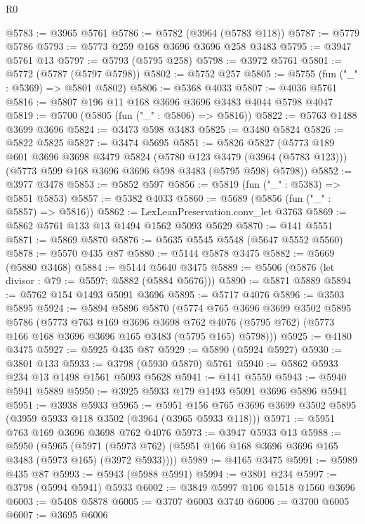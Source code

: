 \begin{lexlean}{R0}
\begin{coremodule}
@5783 := @3965 @5761
@5786 := @5782 (@3964 (@5783 @118))
@5787 := @5779 @5786
@5793 := @5773 @259 @168 @3696 @3696 @258 @3483
@5795 := @3947 @5761 @13
@5797 := @5793 (@5795 @258)
@5798 := @3972 @5761
@5801 := @5772 (@5787 (@5797 @5798))
@5802 := @5752 @257
@5805 := @5755 (fun ("_" : @5369) => @5801 @5802)
@5806 := @5368 @4033
@5807 := @4036 @5761
@5816 := @5807 @196 @11 @168 @3696 @3696 @3483 @4044 @5798 @4047
@5819 := @5700 (@5805 (fun ("_" : @5806) => @5816))
@5822 := @5763 @1488 @3699 @3696
@5824 := @3473 @598 @3483
@5825 := @3480 @5824
@5826 := @5822 @5825
@5827 := @3474 @5695
@5851 := @5826
    @5827
    (@5773
      @189
      @601
      @3696
      @3698
      @3479
      @5824
      (@5780 @123 @3479 (@3964 (@5783 @123)))
      (@5773 @599 @168 @3696 @3696 @598 @3483 (@5795 @598) @5798))
@5852 := @3977 @3478
@5853 := @5852 @597
@5856 := @5819 (fun ("_" : @5383) => @5851 @5853)
@5857 := @5382 @4033
@5860 := @5689 (@5856 (fun ("_" : @5857) => @5816))
@5862 := LexLeanPreservation.conv_let @3763
@5869 := @5862 @5761 @133 @13 @1494 @1562 @5093 @5629
@5870 := @141 @5551
@5871 := @5869 @5870
@5876 := @5635 @5545 @5548 (@5647 @5552 @5560)
@5878 := @5570 @435 @87
@5880 := @5144 @5878 @3475
@5882 := @5669 (@5880 @3468)
@5884 := @5144 @5640 @3475
@5889 := @5506 (@5876 (let divisor : @79 := @5597; @5882 (@5884 @5676)))
@5890 := @5871 @5889
@5894 := @5762 @154 @1493 @5091 @3696
@5895 := @5717 @4076
@5896 := @3503 @5895
@5924 := @5894
    @5896
    @5870
    (@5774
      @765
      @3696
      @3699
      @3502
      @5895
      @5786
      (@5773
        @763
        @169
        @3696
        @3698
        @762
        @4076
        (@5795 @762)
        (@5773 @166 @168 @3696 @3696 @165 @3483 (@5795 @165) @5798)))
@5925 := @4180 @3475
@5927 := @5925 @435 @87
@5929 := @5890 (@5924 @5927)
@5930 := @3801 @133
@5933 := @3798 (@5930 @5870) @5761
@5940 := @5862 @5933 @234 @13 @1498 @1561 @5093 @5628
@5941 := @141 @5559
@5943 := @5940 @5941 @5889
@5950 := @3925 @5933 @179 @1493 @5091 @3696 @5896 @5941
@5951 := @3938 @5933
@5965 := @5951 @156 @765 @3696 @3699 @3502 @5895 (@3959 @5933 @118 @3502 (@3964 (@3965 @5933 @118)))
@5971 := @5951 @763 @169 @3696 @3698 @762 @4076
@5973 := @3947 @5933 @13
@5988 := @5950
    (@5965 (@5971 (@5973 @762) (@5951 @166 @168 @3696 @3696 @165 @3483 (@5973 @165) (@3972 @5933))))
@5989 := @4165 @3475
@5991 := @5989 @435 @87
@5993 := @5943 (@5988 @5991)
@5994 := @3801 @234
@5997 := @3798 (@5994 @5941) @5933
@6002 := @3849 @5997 @106 @1518 @1560 @3696
@6003 := @5408 @5878
@6005 := @3707 @6003 @3740
@6006 := @3700 @6005
@6007 := @3695 @6006

\end{coremodule}
\end{lexlean}
